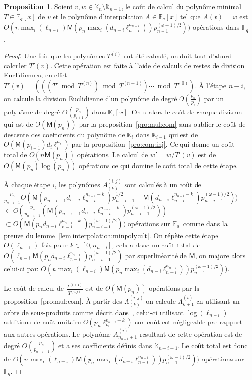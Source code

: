 \documentclass[10pt,a4paper]{book}
\theoremstyle{plain}
\theoremstyle{definition}
\theoremstyle{definition}
\theoremstyle{definition}
\newtheorem{prop}[thm]{Proposition}
\theoremstyle{definition}
\theoremstyle{remark}
\theoremstyle{remark}
\theoremstyle{definition}
\begin{document}
\begin{prop}
  Soient $v,w\in \mathbb{K}_n\setminus \mathbb{K}_{n-1}$, le coût de calcul du polynôme minimal
  $T\in \mathbb{F}_q[x]$ de $v$ et le polynôme d'interpolation $A\in 
  \mathbb{F}_q[x]$ tel que $A(v)=w$ est $O(n\max_i(\ell_{n-i})\mathsf{M}(p_{n}\max_i(d_{n-i}\ell_{n-i}^{n_{n-i}}))p_{n-1}^{(\omega-1)/2}))$ 
  opérations dans $\mathbb{F}_q$.
\end{prop}
\begin{proof}
  Une fois que les polynômes $T^{(i)}$ ont été calculé, on doit tout d'abord 
  calculer $T'(v)$. Cette opération est faite à l'aide de calculs de restes de 
  division Euclidiennes, en effet
  $T'(v) = (((T' \bmod T^{(n)}) \bmod T^{(n-1)}) \cdots \bmod T^{(0)})$.
  \`A l'étape $n-i$, on calcule la division Euclidienne d'un polynôme de degré
   $O(\frac{p_n}{p_i})$ par un polynôme de degré $O(\frac{p_n}{p_{i+1}})$ dans  $\mathbb{K}_i[x]$. 
   On a alors le coût de chaque division qui est de $O(\mathsf{M}(p_n))$ 
   par la proposition~\ref{pro:mul:com} sans oublier le coût de descente des 
   coefficients du polynôme de $\mathbb{K}_i$ dans $\mathbb{K}_{i-1}$ qui est 
   de $O(\mathsf{M}(p_{i-1})d_i\ell_i^{n_i})$ par la proposition~\ref{pro:com:inj}.
   Ce qui donne un coût total de $O(n\mathsf{M}(p_n))$ opérations.
   Le calcul de $w'=w/T'(v)$ est de $O(\mathsf{M}(p_n)\log(p_n))$ opérations ce
   qui domine le coût total de cette étape.

  \`A chaque étape $i$, les polynômes $A^{(i,j)}_{(k)}$ sont calculés à un coût de
  $\frac{p_n}{p_{n-i-1}}O(\mathsf{M}(p_{n-i-1}d_{n-i}\ell_{n-i}^{n_{n-i}-k})p_{n-i-1}^{1/2}+\mathsf{M}(d_{n-i}\ell_{n-i}^{n_{n-i}-k})p_{n-i-1}^{(\omega+1)/2}))$
  $\subset O(\frac{p_n}{p_{n-i-1}}(\mathsf{M}(p_{n-i-1}d_{n-i}\ell_{n-i}^{n_{n-i}-k})p_{n-i-1}^{(\omega-1)/2})) $
  $\subset O(\mathsf{M}(p_{n}d_{n-i}\ell_{n-i}^{n_{n-i}-k})p_{n-i-1}^{(\omega-1)/2}))$
  opérations sur $\mathbb{F}_q$, comme dans la preuve du  
  lemme~\ref{lem:interpolation:minpoly:ult}. On répète cette étape 
  $O(\ell_{n-1})$ fois pour $k \in [0,n_{n-i}]$, cela a donc un coût total de 
  $O(\ell_{n-i}\mathsf{M}(p_nd_{n-i}\ell_{n-i}^{n_{n-i}})p_{n-i-1}^{(\omega-1)/2})$
  par superlinéarité de $\mathsf{M}$, on majore alors celui-ci par:
  $O(n\max_i(\ell_{n-i})\mathsf{M}(p_{n}\max_i(d_{n-i}\ell_{n-i}^{n_{n-i}}))p_{n-1}^{(\omega-1)/2}))$.
  
  
  Le coût de calcul de $\frac{T^{(i+1)}}{T^{(i,j)}}$ est de 
  $O(\mathsf{M}(p_n))$ opérations  par la proposition~\ref{pro:mul:com}.
  \`A partir des $A^{(i,j)}_{(k)}$ on calcule $A^{(i)}_{k+1}$ en utilisant un arbre de 
  sous-produits comme décrit dans~\cite[Lemma~10.4]{vzGJG03}, celui-ci 
  utilisant $\log(\ell_{n-i})$ additions de coût unitaire 
  $O(p_n \ell_{n_i}^{n_{n-i}-k})$ son coût est négligeable par rapport aux 
  autres opérations. Le polynôme $A^{(i)}_{n_{n-i}+1}$ résultant de 
  cette opération est de degré $O(\frac{p_n}{p_{n-i-1}})$ et a ses coefficients
  définis dans $\mathbb{K}_{n-i-1}$.
  Le coût total est donc de 
  $O(n\max_i(\ell_{n-i})\mathsf{M}(p_{n}\max_i(d_{n-i}\ell_{n-i}^{n_{n-i}}))p_{n-1}^{(\omega-1)/2}))$ 
  opérations sur $\mathbb{F}_q$. 
    
\end{proof}
\end{document}
